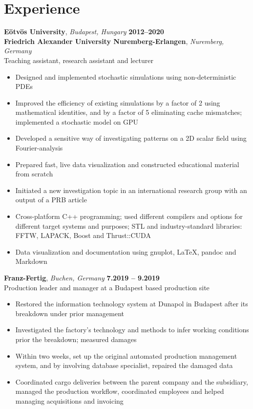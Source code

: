 \documentclass[10pt,USletter,sans]{moderncv}        %
\begin{document}
\section{Experience}
\textbf{Eötvös University}, \emph{Budapest, Hungary}  \hfill \textbf{2012--2020}\\
\textbf{Friedrich Alexander University Nuremberg-Erlangen}, \emph{Nuremberg, Germany}\\
Teaching assistant, research assistant and lecturer
\begin{itemize}
\item Designed and implemented stochastic simulations using non-deterministic PDEs
\item Improved the efficiency of existing simulations by a factor of 2 using mathematical identities, and by a factor of 5 eliminating cache mismatches; implemented a stochastic model on GPU
\item Developed a sensitive way of investigating patterns on a 2D scalar field using Fourier-analysis
\item Prepared fast, live data visualization and constructed educational material from scratch
\item Initiated a new investigation topic in an international research group with an output of a PRB article
\item Cross-platform C++ programming; used different compilers and options for different target systems and purposes; STL and industry-standard libraries: FFTW, LAPACK, Boost and Thrust::CUDA
\item Data visualization and documentation using gnuplot, LaTeX, pandoc and Markdown
\end{itemize}
\vspace{6pt}

\textbf{Franz-Fertig}, \emph{Buchen, Germany}  \hfill \textbf{7.2019 -- 9.2019}\\
Production leader and manager at a Budapest based production site

\begin{itemize}
\item Restored the information technology system at Dunapol in Budapest after its breakdown under prior management
\item Investigated the factory's technology and methods to infer working conditions prior the breakdown; measured damages
\item Within two weeks, set up the original automated production management system, and by involving database specialist, repaired the damaged data
\item Coordinated cargo deliveries between the parent company and the subsidiary, managed the production workflow, coordinated employees and helped managing acquisitions and invoicing
\end{itemize}
\vspace{3pt}
\end{document}
